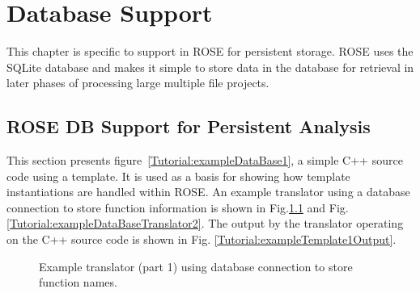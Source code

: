 \chapter{Database Support}

    This chapter is specific to support in ROSE for persistent storage.
ROSE uses the SQLite database and makes it simple to store data in the
database for retrieval in later phases of processing large multiple file projects.


\section{ROSE DB Support for Persistent Analysis}

   This section presents figure~\ref{Tutorial:exampleDataBase1}, a simple 
C++ source code using a template. It is used as a basis for showing how 
template instantiations are handled within ROSE. An example translator
using a database connection to store function information is shown in 
Fig.\ref{Tutorial:exampleDataBaseTranslator1} 
and Fig.\ref{Tutorial:exampleDataBaseTranslator2}. The output by the
translator operating on the C++ source code is shown in Fig. \ref{Tutorial:exampleTemplate1Output}. 


\begin{figure}[!h]
{\indent
{\mySmallFontSize


\begin{latexonly}
   
\end{latexonly}

\begin{htmlonly}
   
\end{htmlonly}

}
}
\caption{Example translator (part 1) using database connection to store function names.}
\label{Tutorial:exampleDataBaseTranslator1}
\end{figure}


